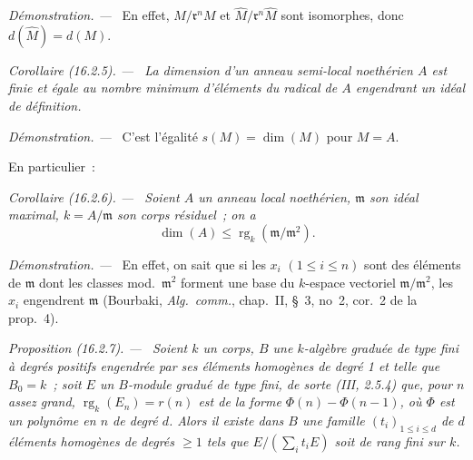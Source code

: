 \documentclass[10pt,oneside]{book}
\makeatletter
\newcommand{\setmanualcurrentlabel}[1]{\def\@currentlabel{#1}}
\newcommand{\oldpage}[2][]{%
  \setcounter{footnote}{0}%
  \marginpar{\scriptsize\textbf{#1}~|~#2}\ignorespaces}
\newenvironment{proposition}[1][]{%
  \setmanualcurrentlabel{#1}\par\medskip\noindent\itshape Proposition (#1). ---\ }{\par}
\newenvironment{corollary}[1][]{%
  \setmanualcurrentlabel{#1}\par\medskip\noindent\itshape Corollaire (#1). ---\ }{\par}
\newenvironment{proof}{%
  \par\medskip\noindent\textit{Démonstration. ---\ }}{\par}
\makeatother
\begin{document}
\oldpage[0\textsubscript{IV-1}]{28}

\begin{proof}
En effet, $M/\mathfrak{r}^nM$ et
$\widehat{M}/\mathfrak{r}^n\widehat{M}$ sont isomorphes, donc
$d(\widehat{M})=d(M)$.
\end{proof}

\begin{corollary}[16.2.5]
\label{0.16.2.5-fr}
La dimension d'un anneau semi-local noethérien $A$ est finie et égale au
nombre minimum d'éléments du radical de $A$ engendrant un idéal de définition.
\end{corollary}

\begin{proof}
C'est l'égalité $s(M)=\dim(M)$ pour $M=A$.
\end{proof}

En particulier~:

\begin{corollary}[16.2.6]
\label{0.16.2.6-fr}
Soient $A$ un anneau local noethérien, $\mathfrak{m}$ son idéal maximal,
$k=A/\mathfrak{m}$ son corps résiduel~; on a
\begin{equation}
\label{0.16.2.6.1-fr}
\tag{16.2.6.1}
  \dim(A)\leq\operatorname{rg}_k(\mathfrak{m}/\mathfrak{m}^2).
\end{equation}
\end{corollary}

\begin{proof}
En effet, on sait que si les $x_i$ $(1\leq i\leq n)$ sont des éléments de
$\mathfrak{m}$ dont les classes mod.~$\mathfrak{m}^2$ forment une base du
$k$-espace vectoriel $\mathfrak{m}/\mathfrak{m}^2$, les $x_i$ engendrent
$\mathfrak{m}$ (Bourbaki, \emph{Alg.~comm.}, chap.~II, \S~3, no~2, cor.~2 de
la prop.~4).
\end{proof}

\begin{proposition}[16.2.7]
\label{0.16.2.7-fr}
Soient $k$ un corps, $B$ une $k$-algèbre graduée de type fini à degrés
positifs engendrée par ses éléments homogènes de degré 1 et telle que $B_0=k$~;
soit $E$ un $B$-module gradué de type fini, de sorte (III, 2.5.4) que, pour $n$
assez grand, $\operatorname{rg}_k(E_n)=r(n)$ est de la forme
$\Phi(n)-\Phi(n-1)$, où $\Phi$ est un polynôme en $n$ de degré $d$. Alors il
existe dans $B$ une famille $(t_i)_{1\leq i\leq d}$ de $d$ éléments homogènes
de degrés $\geq1$ tels que $E/(\sum_i t_iE)$ soit de rang fini sur $k$.
\end{proposition}
\end{document}
